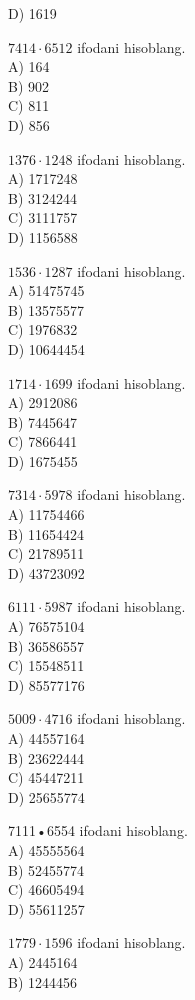 D) 1619
  \item $7414 \cdot 6512$ ifodani hisoblang.\\
A) 164\\
B) 902\\
C) 811\\
D) 856
  \item $1376 \cdot 1248$ ifodani hisoblang.\\
A) 1717248\\
B) 3124244\\
C) 3111757\\
D) 1156588
  \item $1536 \cdot 1287$ ifodani hisoblang.\\
A) 51475745\\
B) 13575577\\
C) 1976832\\
D) 10644454
  \item $1714 \cdot 1699$ ifodani hisoblang.\\
A) 2912086\\
B) 7445647\\
C) 7866441\\
D) 1675455
  \item $7314 \cdot 5978$ ifodani hisoblang.\\
A) 11754466\\
B) 11654424\\
C) 21789511\\
D) 43723092
  \item $6111 \cdot 5987$ ifodani hisoblang.\\
A) 76575104\\
B) 36586557\\
C) 15548511\\
D) 85577176
  \item $5009 \cdot 4716$ ifodani hisoblang.\\
A) 44557164\\
B) 23622444\\
C) 45447211\\
D) 25655774
  \item 7111•6554 ifodani hisoblang.\\
A) 45555564\\
B) 52455774\\
C) 46605494\\
D) 55611257
  \item $1779 \cdot 1596$ ifodani hisoblang.\\
A) 2445164\\
B) 1244456\\
